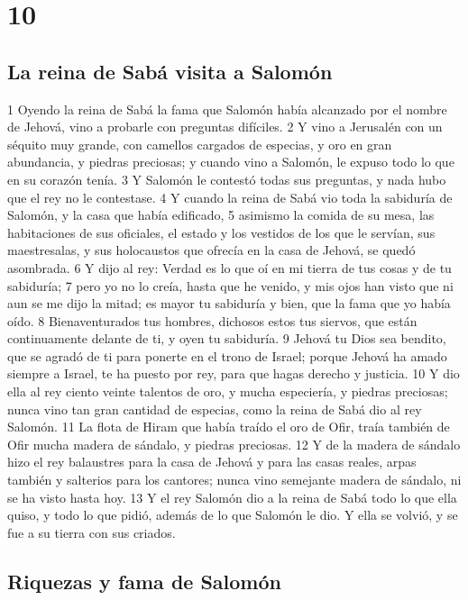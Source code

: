 \chapter{10}

\section*{La reina de Sabá visita a Salomón}

 

1 Oyendo la reina de Sabá la fama que Salomón había alcanzado por el nombre de Jehová, vino a probarle con preguntas difíciles.
2 Y vino a Jerusalén con un séquito muy grande, con camellos cargados de especias, y oro en gran abundancia, y piedras preciosas; y cuando vino a Salomón, le expuso todo lo que en su corazón tenía.
3 Y Salomón le contestó todas sus preguntas, y nada hubo que el rey no le contestase.
4 Y cuando la reina de Sabá vio toda la sabiduría de Salomón, y la casa que había edificado,
5 asimismo la comida de su mesa, las habitaciones de sus oficiales, el estado y los vestidos de los que le servían, sus maestresalas, y sus holocaustos que ofrecía en la casa de Jehová, se quedó asombrada.
6 Y dijo al rey: Verdad es lo que oí en mi tierra de tus cosas y de tu sabiduría;
7 pero yo no lo creía, hasta que he venido, y mis ojos han visto que ni aun se me dijo la mitad; es mayor tu sabiduría y bien, que la fama que yo había oído.
8 Bienaventurados tus hombres, dichosos estos tus siervos, que están continuamente delante de ti, y oyen tu sabiduría.
9 Jehová tu Dios sea bendito, que se agradó de ti para ponerte en el trono de Israel; porque Jehová ha amado siempre a Israel, te ha puesto por rey, para que hagas derecho y justicia.
10 Y dio ella al rey ciento veinte talentos de oro,  y mucha especiería, y piedras preciosas; nunca vino tan gran cantidad de especias, como la reina de Sabá dio al rey Salomón.
11 La flota de Hiram que había traído el oro de Ofir, traía también de Ofir mucha madera de sándalo, y piedras preciosas.
12 Y de la madera de sándalo hizo el rey balaustres para la casa de Jehová y para las casas reales, arpas también y salterios para los cantores; nunca vino semejante madera de sándalo, ni se ha visto hasta hoy.
13 Y el rey Salomón dio a la reina de Sabá todo lo que ella quiso, y todo lo que pidió, además de lo que Salomón le dio. Y ella se volvió, y se fue a su tierra con sus criados.
\section*{Riquezas y fama de Salomón}

